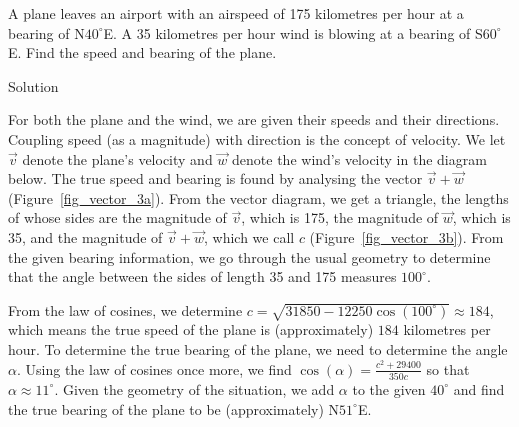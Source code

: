 \begin{example} \label{vectorbearingex}  
A plane leaves an airport with an airspeed  of 175 kilometres per hour at a  bearing of  N$40^{\circ}$E.  A 35 kilometres per hour wind is blowing at a bearing of S$60^{\circ}$E.  Find the speed and  bearing of the plane.

Solution 

For both the plane and the wind, we are given their speeds and their directions.  Coupling speed (as a magnitude) with direction is the concept of velocity. We let $\vec{v}$ denote the plane's velocity and $\vec{w}$ denote the wind's velocity in the diagram below.   The true speed and bearing is found by analysing the vector $\vec{v} + \vec{w}$ (Figure~\ref{fig_vector_3a}).  From the vector diagram, we get a triangle, the lengths of whose sides are the magnitude of $\vec{v}$, which is 175, the magnitude of $\vec{w}$, which is 35, and the magnitude of $\vec{v} + \vec{w}$, which we call $c$ (Figure~\ref{fig_vector_3b}). From the given bearing information, we go through the usual geometry to determine that the angle between the sides of length 35 and 175 measures $100^{\circ}$. 

From the law of cosines, we determine $c = \sqrt{31850 - 12250\cos(100^{\circ})} \approx 184$, which means the true speed of the plane is (approximately) $184$ kilometres per hour.  To determine the true bearing of the plane, we need to determine the angle $\alpha$.  Using the law of cosines once more, we find $\cos(\alpha) = \frac{c^2+29400}{350c}$ so that $\alpha \approx 11^{\circ}$.  Given the geometry of the situation, we add $\alpha$ to the given $40^{\circ}$ and find the true bearing of the plane to be (approximately) N$51^{\circ}$E. 


\end{example}
